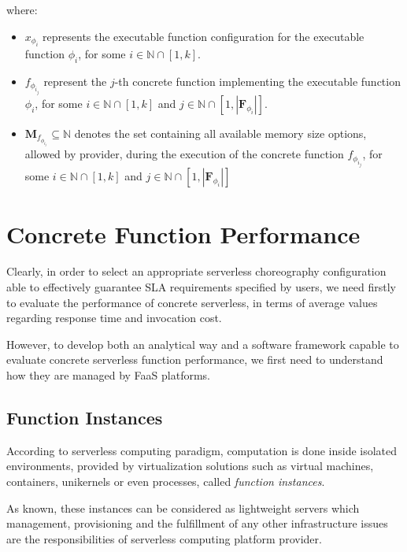 \documentclass[12pt,a4paper]{report}
\newcommand*{\N}{\mathbb{N}}
\theoremstyle{definition}
\begin{document}
where:

\begin{itemize}
	\item $x_{\phi_{i}}$ represents the executable function configuration for the executable function $\phi_{i}$, for some  $i \in \N \cap \left[ 1, k \right]$.
	
	\item $f_{\phi_{i_j}}$ represent the $j$-th concrete function implementing the executable function $\phi_{i}$, for some  $i \in \N \cap \left[ 1, k \right]$ and $j \in \N \cap \left[ 1, |\textbf{F}_{\phi_{i}}| \right]$.
	
	\item $\textbf{M}_{f_{\phi_{i_j}}} \subseteq \N$ denotes the set containing all available memory size options, allowed by provider, during the execution of the concrete function $f_{\phi_{i_j}}$, for some $i \in \N \cap \left[ 1, k \right]$ and $j \in \N \cap \left[ 1, |\textbf{F}_{\phi_{i}}| \right]$
\end{itemize}

\section{Concrete Function Performance}

Clearly, in order to select an appropriate serverless choreography configuration able to effectively guarantee SLA requirements specified by users, we need firstly to evaluate the performance of concrete serverless, in terms of average values regarding response time and invocation cost.

However, to develop both an analytical way and a software framework capable to evaluate concrete serverless function performance, we first need to understand
how they are managed by FaaS platforms.

\subsection{Function Instances}

According to serverless computing paradigm, computation is done inside isolated environments, provided by virtualization solutions such as virtual machines, containers, unikernels or even processes, called \textit{function instances}.

As known, these instances can be considered as lightweight servers which management, provisioning and the fulfillment of any other infrastructure issues are the responsibilities of serverless computing platform provider.
\end{document}
